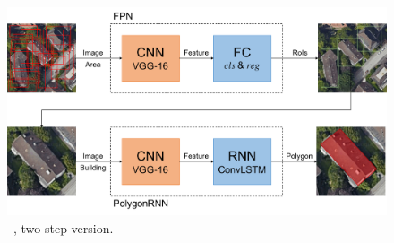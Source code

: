 \begin{figure}[!h]
	\centering
	\includegraphics[width=\fig\textwidth]{3-15.pdf}
    \caption[\modelnameshort\ , two-step version]{\modelnameshort\ , two-step version.}
    \label{fig:stpmod}
\end{figure}